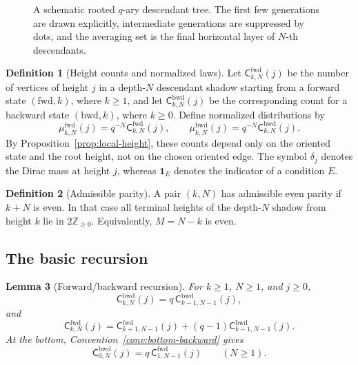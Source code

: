 \documentclass[11pt]{amsart}
\theoremstyle{definition}
\newtheorem{definition}{Definition}[section]
\theoremstyle{plain}
\newtheorem{lemma}[definition]{Lemma}
\newcommand{\ZZ}{\mathbb Z}
\newcommand{\fwd}{\mathrm{fwd}}
\newcommand{\bwd}{\mathrm{bwd}}
\newcommand{\Desc}{\operatorname{Desc}}
\begin{document}
\begin{figure}[ht]
\caption{A schematic rooted $q$-ary descendant tree.  The first few generations are drawn explicitly, intermediate generations are suppressed by dots, and the averaging set is the final horizontal layer of $N$-th descendants.}
\label{fig:terminal-shadow}
\end{figure}

\begin{definition}[Height counts and normalized laws]
Let \(\mathsf C^{\fwd}_{k,N}(j)\) be the number of vertices of height \(j\) in a
depth-\(N\) descendant shadow starting from a forward state \((\fwd,k)\),
where \(k\ge1\), and
let \(\mathsf C^{\bwd}_{k,N}(j)\) be the corresponding count for a backward state
\((\bwd,k)\), where \(k\ge0\).  Define normalized distributions by
\[
\mu^{\fwd}_{k,N}(j)=q^{-N}\mathsf C^{\fwd}_{k,N}(j),
\qquad
\mu^{\bwd}_{k,N}(j)=q^{-N}\mathsf C^{\bwd}_{k,N}(j).
\]
By Proposition~\ref{prop:local-height}, these counts depend only on the
oriented state and the root height, not on the chosen oriented edge.
The symbol \(\delta_j\) denotes the Dirac mass at height \(j\), whereas
\(\mathbf 1_E\) denotes the indicator of a condition \(E\).
\end{definition}

\begin{definition}[Admissible parity]
A pair \((k,N)\) has admissible even parity if \(k+N\) is even.  In that case all
terminal heights of the depth-\(N\) shadow from height \(k\) lie in
\(2\ZZ_{\ge0}\).  Equivalently, \(M=N-k\) is even.
\end{definition}

\subsection{The basic recursion}
\begin{lemma}[Forward/backward recursion]\label{lem:recursion}
For \(k\ge1\), \(N\ge1\), and \(j\ge0\),
\[
\mathsf C^{\bwd}_{k,N}(j)=q\,\mathsf C^{\bwd}_{k-1,N-1}(j),
\]
and
\[
\mathsf C^{\fwd}_{k,N}(j)=\mathsf C^{\fwd}_{k+1,N-1}(j)+(q-1)\mathsf C^{\bwd}_{k-1,N-1}(j).
\]
At the bottom, Convention~\ref{conv:bottom-backward} gives
\[
\mathsf C^{\bwd}_{0,N}(j)=q\,\mathsf C^{\fwd}_{1,N-1}(j)\qquad(N\ge1).
\]
\end{lemma}
\end{document}
